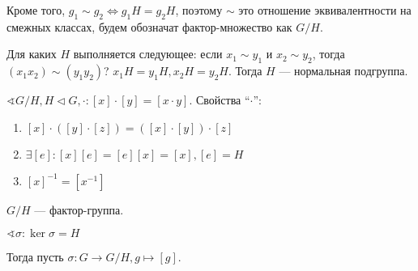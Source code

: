 Кроме того, \(g_1 \sim g_2 \Leftrightarrow g_1H = g_2H\), поэтому \(\sim\) это отношение эквивалентности на смежных классах, будем обозначат фактор-множество как \(G / H\).

Для каких \(H\) выполняется следующее: если \(x_1 \sim y_1\) и \(x_2 \sim y_2\), тогда \((x_1 x_2) \sim (y_1 y_2)\)? \(x_1 H = y_1 H, x_2 H = y_2 H\). Тогда \(H\) --- нормальная подгруппа.

\(\sphericalangle G / H, H \triangleleft G, \cdot : [x] \cdot [y] = [x \cdot y]\).
Свойства ``\( \cdot \)'':
\begin{enumerate}
    \item \([x] \cdot ([y] \cdot [z]) = ([x] \cdot [y]) \cdot [z]\)
    \item \(\exists [e] : [x][e] = [e][x] = [x], [e] = H\)
    \item \([x]^{-1} = [x^{-1}]\)
\end{enumerate}
\begin{remark}
    \(G / H\) --- фактор-группа.
\end{remark}

\(\sphericalangle \sigma : \ker \sigma = H\)

Тогда пусть \(\sigma : G \to G / H, g \mapsto [g]\).
